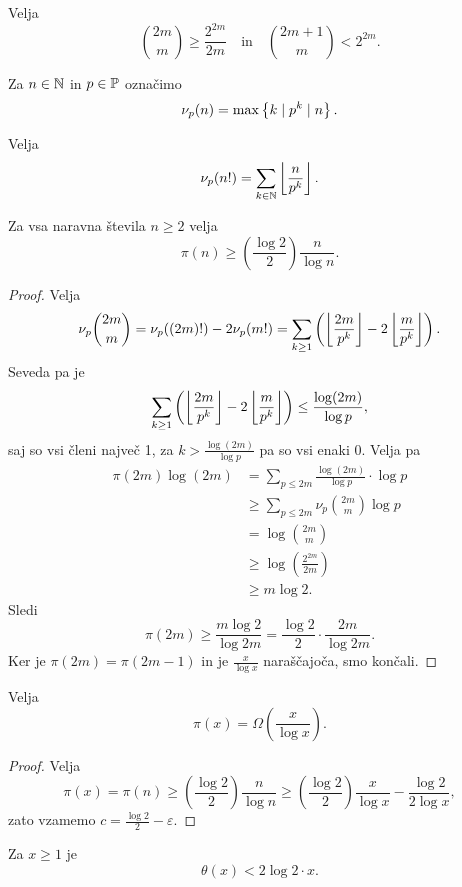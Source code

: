 \documentclass[12pt, a4paper]{article}
\begin{document}
\begin{lema}
Velja
\[
\binom{2m}{m}\geq\frac{2^{2m}}{2m}\quad\text{in}\quad\binom{2m+1}{m}<2^{2m}.
\]
\end{lema}

\begin{definicija}
Za $n\in\N$ in $p\in\P$ označimo
\[
\nu_p(n)=\max\set{k\mid p^k\mid n}.
\]
\end{definicija}

\begin{lema}
Velja
\[
\nu_p(n!)=\sum_{k\in\N}\floor{\frac{n}{p^k}}.
\]
\end{lema}

\obvs

\begin{izrek}
Za vsa naravna števila $n\geq 2$ velja
\[
\pi(n)\geq\left(\frac{\log 2}{2}\right)\frac{n}{\log n}.
\]
\end{izrek}

\begin{proof}
Velja
\[
\nu_p\binom{2m}{m}=\nu_p((2m)!)-2\nu_p(m!)=\sum_{k\geq 1}\left(\floor{\frac{2m}{p^k}}-2\floor{\frac{m}{p^k}}\right).
\]
Seveda pa je
\[
\sum_{k\geq 1}\left(\floor{\frac{2m}{p^k}}-2\floor{\frac{m}{p^k}}\right)\leq\frac{\log(2m)}{\log p},
\]
saj so vsi členi največ 1, za $k>\frac{\log(2m)}{\log p}$ pa so vsi enaki 0. Velja pa
\begin{align*}
\pi(2m)\log(2m)&=\sum_{p\leq 2m}\frac{\log(2m)}{\log p}\cdot\log p
\\
&\geq\sum_{p\leq 2m}\nu_p\binom{2m}{m}\log p
\\
&=\log\binom{2m}{m}
\\
&\geq \log\left(\frac{2^{2m}}{2m}\right)
\\
&\geq m\log 2.
\end{align*}
Sledi
\[
\pi(2m)\geq \frac{m\log 2}{\log 2m}=\frac{\log 2}{2}\cdot\frac{2m}{\log 2m}.
\]
Ker je $\pi(2m)=\pi(2m-1)$ in je $\frac{x}{\log x}$ naraščajoča, smo končali.
\end{proof}

\begin{posledica}
Velja
\[
\pi(x)=\Omega\left(\frac{x}{\log x}\right).
\]
\end{posledica}

\begin{proof}
Velja
\[
\pi(x)=\pi(n)\geq\left(\frac{\log 2}{2}\right)\frac{n}{\log n}\geq\left(\frac{\log 2}{2}\right)\frac{x}{\log x}-\frac{\log 2}{2\log x},
\]
zato vzamemo $c=\frac{\log 2}{2}-\varepsilon$.
\end{proof}


\begin{izrek}
Za $x\geq 1$ je
\[
\theta(x)<2\log 2\cdot x.
\]
\end{izrek}



\newpage
\printindex
\end{document}
